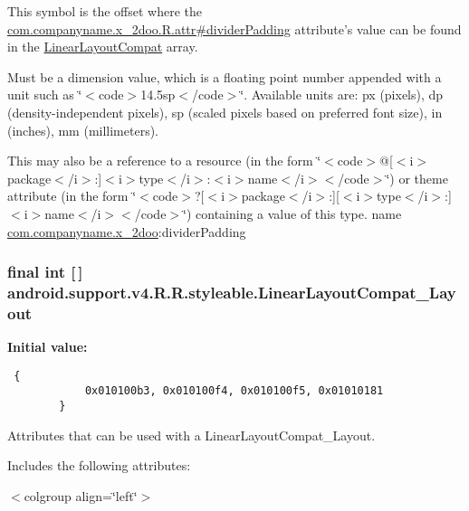 This symbol is the offset where the \hyperlink{classcom_1_1companyname_1_1x__2doo_1_1_r_1_1attr_e4acde97febf88123516d78fab6674d4}{com.companyname.x\_\-2doo.R.attr\#dividerPadding} attribute's value can be found in the \hyperlink{classandroid_1_1support_1_1v4_1_1_r_1_1styleable_d67ed8d09a6471da7a8c3ba1552dad7e}{LinearLayoutCompat} array.

Must be a dimension value, which is a floating point number appended with a unit such as \char`\"{}$<$code$>$14.5sp$<$/code$>$\char`\"{}. Available units are: px (pixels), dp (density-independent pixels), sp (scaled pixels based on preferred font size), in (inches), mm (millimeters). 

This may also be a reference to a resource (in the form \char`\"{}$<$code$>$@\mbox{[}$<$i$>$package$<$/i$>$:\mbox{]}$<$i$>$type$<$/i$>$:$<$i$>$name$<$/i$>$$<$/code$>$\char`\"{}) or theme attribute (in the form \char`\"{}$<$code$>$?\mbox{[}$<$i$>$package$<$/i$>$:\mbox{]}\mbox{[}$<$i$>$type$<$/i$>$:\mbox{]}$<$i$>$name$<$/i$>$$<$/code$>$\char`\"{}) containing a value of this type.  name \hyperlink{namespacecom_1_1companyname_1_1x__2doo}{com.companyname.x\_\-2doo}:dividerPadding \hypertarget{classandroid_1_1support_1_1v4_1_1_r_1_1styleable_a8dc84dfe6c307db75f05c4257866884}{
\subsubsection[{LinearLayoutCompat\_\-Layout}]{\setlength{\rightskip}{0pt plus 5cm}final int \mbox{[}$\,$\mbox{]} android.support.v4.R.R.styleable.LinearLayoutCompat\_\-Layout}}
\label{classandroid_1_1support_1_1v4_1_1_r_1_1styleable_a8dc84dfe6c307db75f05c4257866884}


\textbf{Initial value:}

\begin{Code}\begin{verbatim} {
            0x010100b3, 0x010100f4, 0x010100f5, 0x01010181
        }
\end{verbatim}
\end{Code}
Attributes that can be used with a LinearLayoutCompat\_\-Layout. 

Includes the following attributes: \begin{TabularC}{0}
\hline
\end{TabularC}
$<$colgroup align=\char`\"{}left\char`\"{}$>$ 

